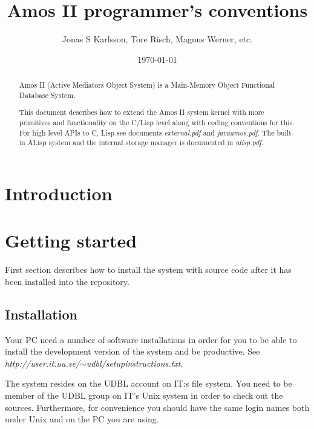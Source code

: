 \setlength{\parindent}{0in}
\parskip 6pt
\textwidth 6.5in
\oddsidemargin -0.16in
\title{Amos II programmer's conventions}
\author{Jonas S Karlsson, Tore Risch, Magnus Werner, etc.}
\date{\today}
\def\margsum#1{ \marginpar{$\P$\footnotesize#1}}
\def\marnote#1{ \marginpar{$\Leftarrow$\scriptsize#1}}
\def\LDL{\mbox{$\cal LDL$}}
\def\blackslug{\vrule height4pt width5pt depth2pt}



\maketitle
\begin{abstract}
Amos II (Active Mediators Object System) is a Main-Memory Object Functional
Database System. 


This document describes how to extend the Amos II system kernel with
more primitives and functionality on the C/Lisp level along with
coding conventions for this. For high level APIs to C, Lisp see
documents {\em external.pdf} and {\em javaamos.pdf}. The built-in ALisp
system and the internal storage manager is documented in {\em
alisp.pdf}.

\end{abstract}
\newpage
\tableofcontents
\newpage
\section{Introduction}

\section{Getting started}
First section describes how to install the system with source
code after it has been installed into the repository.

\subsection{Installation}
\label{install}
Your PC need a number of software installations in order for you to be
able to install the development version of the system and be
productive. See {\em
http://user.it.uu.se/$\sim$udbl/setupinstructions.txt}.

The system resides on the UDBL account on IT:s file system. You need
to be member of the UDBL group on IT's Unix system in order to check
out the sources. Furthermore, for convenience you should have the same
login names both under Unix and on the PC you are using.

